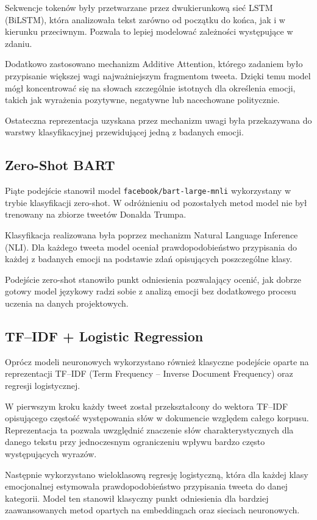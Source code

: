\documentclass[a4paper,12pt]{article}
\begin{document}
Sekwencje tokenów były przetwarzane przez dwukierunkową sieć LSTM (BiLSTM), która analizowała tekst zarówno od początku do końca, jak i w kierunku przeciwnym. Pozwala to lepiej modelować zależności występujące w zdaniu.

Dodatkowo zastosowano mechanizm Additive Attention, którego zadaniem było przypisanie większej wagi najważniejszym fragmentom tweeta. Dzięki temu model mógł koncentrować się na słowach szczególnie istotnych dla określenia emocji, takich jak wyrażenia pozytywne, negatywne lub nacechowane politycznie.

Ostateczna reprezentacja uzyskana przez mechanizm uwagi była przekazywana do warstwy klasyfikacyjnej przewidującej jedną z badanych emocji.

\subsection{Zero-Shot BART}

Piąte podejście stanowił model \texttt{facebook/bart-large-mnli} wykorzystany w trybie klasyfikacji zero-shot. W odróżnieniu od pozostałych metod model nie był trenowany na zbiorze tweetów Donalda Trumpa.

Klasyfikacja realizowana była poprzez mechanizm Natural Language Inference (NLI). Dla każdego tweeta model oceniał prawdopodobieństwo przypisania do każdej z badanych emocji na podstawie zdań opisujących poszczególne klasy.

Podejście zero-shot stanowiło punkt odniesienia pozwalający ocenić, jak dobrze gotowy model językowy radzi sobie z analizą emocji bez dodatkowego procesu uczenia na danych projektowych.

\subsection{TF--IDF + Logistic Regression}

Oprócz modeli neuronowych wykorzystano również klasyczne podejście oparte na reprezentacji TF--IDF (Term Frequency -- Inverse Document Frequency) oraz regresji logistycznej.

W pierwszym kroku każdy tweet został przekształcony do wektora TF--IDF opisującego częstość występowania słów w dokumencie względem całego korpusu. Reprezentacja ta pozwala uwzględnić znaczenie słów charakterystycznych dla danego tekstu przy jednoczesnym ograniczeniu wpływu bardzo często występujących wyrazów.

Następnie wykorzystano wieloklasową regresję logistyczną, która dla każdej klasy emocjonalnej estymowała prawdopodobieństwo przypisania tweeta do danej kategorii. Model ten stanowił klasyczny punkt odniesienia dla bardziej zaawansowanych metod opartych na embeddingach oraz sieciach neuronowych.
\end{document}
